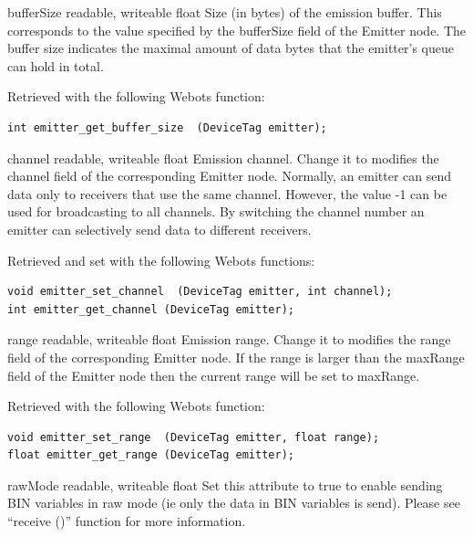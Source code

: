 \noindent
\begin{itemize}
\begin{attribute}{bufferSize}
  {readable, writeable}
  {float}
  {}
  Size (in bytes) of the emission buffer. This
  corresponds to the value specified by the bufferSize field of the
  Emitter node. The buffer size indicates the maximal amount of data
  bytes that the emitter's queue can hold in total.


  Retrieved with the following Webots function:


\begin{lstlisting}
int emitter_get_buffer_size  (DeviceTag emitter);
\end{lstlisting}
\end{attribute}

\begin{attribute}{channel}
  {readable, writeable}
  {float}
  {}
  Emission channel. Change it to modifies the channel
  field of the corresponding Emitter node. Normally, an emitter can
  send data only to receivers that use the same channel. However, the
  value -{}1 can be used for broadcasting to all channels. By
  switching the channel number an emitter can selectively send data to
  different receivers.


  Retrieved and set with the following Webots functions:


\begin{lstlisting}
void emitter_set_channel  (DeviceTag emitter, int channel);
int emitter_get_channel (DeviceTag emitter);
\end{lstlisting}
\end{attribute}

\begin{attribute}{range}
  {readable, writeable}
  {float}
  {}
  Emission range. Change it to modifies the range field of
 the corresponding Emitter node. If the range is larger than the
 maxRange field of the Emitter node then the current range will be set
 to maxRange.


          Retrieved with the following Webots function:


\begin{lstlisting}
void emitter_set_range  (DeviceTag emitter, float range);
float emitter_get_range (DeviceTag emitter);
\end{lstlisting}
\end{attribute}

\begin{attribute}{rawMode}
  {readable, writeable}
  {float}
  {}
  Set this attribute to true to enable sending BIN
 variables in raw mode (ie only the data in BIN variables is
 send). Please see ``receive ()'' function for more information.
\end{attribute}

\end{itemize}

